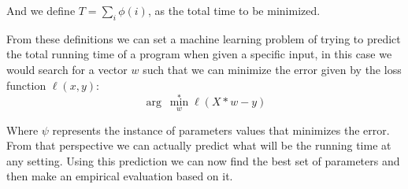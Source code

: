 And we define $T = \displaystyle\sum\limits_{i} \phi(i)$, as the total time to be minimized.

From these definitions we can set a machine learning problem of trying to predict the total running time of a program when given a specific input, in this case we would search for a vector $w$ such that we can minimize the error given by the loss function $\ell(x, y)$:
\[\arg\ \min_w^{\ast} \ell(X*w - y)\]

Where $\psi$ represents the instance of parameters values that minimizes the error. From that perspective we can actually predict what will be the running time at any setting. Using this prediction we can now find the best set of parameters and then make an empirical evaluation based on it.
